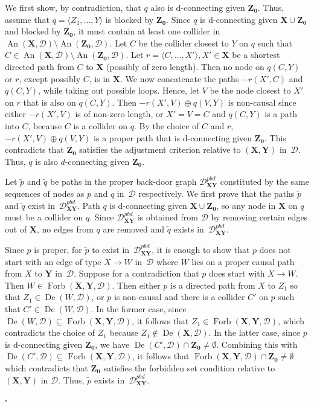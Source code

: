 \documentclass[11pt,a4paper]{article}
\newcommand{\bX}{\mathbf{X}}
\newenvironment{proofof}[1][]{\begin{trivlist}
   \item[\hskip \labelsep {\bfseries Proof of #1.}]}{\hfill{}$\square$\end{trivlist}}
\DeclareMathOperator{\De}{De}
\DeclareMathOperator{\An}{An}
\DeclareMathOperator{\Forbi}{Forb}
\newcommand{\forb}{the forbidden set condition\xspace}
\newcommand{\g}[1][G]{\mathcal{#1}}
\newcommand{\gpbd}[2][G]{\mathcal{#1}_{\mathbf{#2}}^{pbd}}
\newcommand{\fb}[2][X,Y]{\Forbi(\mathbf{#1},#2)}%
\begin{document}
\begin{proofof}[Lemma~\ref{lemma:zprime satisfies ac}]
We first show, by contradiction, that $q$ also is d-connecting given $\mathbf{Z_0}$.
Thus, assume that $q=\langle Z_1,\ldots, Y \rangle$ is blocked by $\mathbf{Z_0}$.
Since $q$ is d-connecting given $\mathbf{X} \cup \mathbf{Z_0}$ and blocked by $\mathbf{Z_0}$, it must contain at least one collider in $\An(\bX,\g[D]) \setminus \An(\mathbf{Z_0},\g[D])$.
Let $C$ be the collider closest to $Y$ on $q$ such that $C \in \An(\bX,\g[D]) \setminus \An(\mathbf{Z_0},\g[D])$. Let $r=\langle C,\ldots,X' \rangle, X' \in \mathbf{X}$ be a shortest directed path from $C$ to $\mathbf{X}$ (possibly of zero length). Then no node on $q(C,Y)$ or $r$, except possibly $C$, is in $\mathbf{X}$.
 We now concatenate the paths $-r(X',C)$ and $q(C,Y)$, while taking out possible loops. Hence, let $V$ be the node closest to $X'$ on $r$ that is also on $q(C,Y)$.
Then $-r(X',V) \oplus q(V,Y)$ is non-causal since either $-r(X',V)$ is of non-zero length, or $X'=V=C$ and $q(C,Y)$ is a path into $C$, because $C$ is a collider on $q$. By the choice of $C$ and $r$, $-r(X',V) \oplus q(V,Y)$ is a proper path that is d-connecting given $\mathbf{Z_0}$. This contradicts that $\mathbf{Z_0}$ satisfies the adjustment criterion relative to $(\mathbf{X,Y})$ in~$\g[D]$.
Thus, $q$ is also $d$-connecting given $\mathbf{Z_0}$.

Let $\tilde{p}$ and $\tilde{q}$ be paths in the proper back-door graph $\gpbd[D]{XY}$ constituted by the same sequences of nodes as $p$ and $q$ in~$\g[D]$ respectively.
We first prove that the paths $\tilde{p}$ and $\tilde{q}$ exist in~$\gpbd[D]{XY}$.
Path $q$ is d-connecting given $\bX \cup \mathbf{Z_0}$, so any node in $\mathbf{X}$ on $q$ must be a collider on $q$.
Since $\gpbd[D]{XY}$ is obtained from $\g[D]$ by removing certain edges out of $\mathbf{X}$, no edges from $q$ are removed and $\tilde{q}$ exists in~$\gpbd[D]{XY}$.

Since $p$ is proper, for $\tilde{p}$ to exist in~$\gpbd[D]{XY}$, it is enough to show that $p$ does not start with an edge of type $X \rightarrow W$ in~$\g[D]$ where $W$ lies on a proper causal path from $X$ to $\mathbf{Y}$ in~$\g[D]$.
Suppose for a contradiction that $p$ does start with $X \rightarrow W$. Then $W \in \fb{\g[D]}$. Then either $p$ is a directed path from $X$ to $Z_1$ so that $Z_1 \in \De(W,\g[D])$, or $p$ is non-causal and there is a collider $C'$ on $p$ such that $C' \in \De(W,\g[D])$. In the former case, since $\De(W,\g[D]) \subseteq \fb{\g[D]}$, it follows that $Z_1 \in \fb{\g[D]}$, which contradicts the choice of $Z_1$ because $Z_1 \notin \De(\mathbf{X},\g[D])$. In the latter case, since $p$ is d-connecting given $\mathbf{Z_0}$, we have $\De(C',\g[D]) \cap \mathbf{Z_0} \neq \emptyset$. Combining this with $\De(C',\g[D]) \subseteq \fb{\g[D]}$, it follows that $\fb{\g[D]} \cap \mathbf{Z_0} \neq \emptyset$ which contradicts that $\mathbf{Z_0}$ satisfies 
\forb{} relative to $(\mathbf{X,Y})$ in $\g[D]$.
Thus, $\tilde{p}$ exists in~$\gpbd[D]{\mathbf{XY}}$.



\end{proofof}
\end{document}
